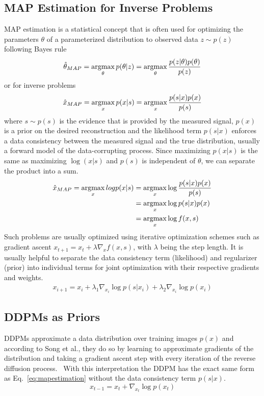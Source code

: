 \subsection{MAP Estimation for Inverse Problems}
MAP estimation is a statistical concept that is often used for optimizing the parameters $\theta$ of a parameterized distribution to observed data $z\sim p(z)$ following Bayes rule
\begin{equation}
    \hat{\theta}_{MAP} = \operatorname*{argmax}_{\theta} p(\theta | z) = \operatorname*{argmax}_{\theta}\frac{p(z|\theta)p(\theta)}{p(z)}
\end{equation}
or for inverse problems
\begin{equation}
    \hat{x}_{MAP} = \operatorname*{argmax}_x p(x|s) = \operatorname*{argmax}_x \frac{p(s|x)p(x)}{p(s)}
\end{equation}
where $s \sim p(s)$ is the evidence that is provided by the measured signal, $p(x)$ is a prior on the desired reconstruction and the likelihood term $p(s|x)$ enforces a data consistency between the measured signal and the true distribution, usually a forward model of the data-corrupting process. Since maximizing $p(x|s)$ is the same as maximizing $\log(x|s)$ and $p(s)$ is independent of $\theta$, we can separate the product into a sum.
\begin{align}
    \hat{x}_{MAP} = \operatorname*{argmax}_x log p(x|s) & = \operatorname*{argmax}_x \log{\frac{p(s|x)p(x)}{p(s)}} \\
                                         & = \operatorname*{argmax}_x \log p(s|x)p(x)               \\
                                         & = \operatorname*{argmax}_x \log f(x, s)
\end{align}
Such problems are usually optimized using iterative optimization schemes such as gradient ascent $x_{t+1} = x_{t} + \lambda \nabla_{x} f(x, s)$, with $\lambda$ being the step length. It is usually helpful to separate the data consistency term (likelihood) and regularizer (prior) into individual terms for joint optimization with their respective gradients and weights.
\begin{align}
    \label{eq:mapestimation}
    x_{i+1} = x_{i} + \lambda_1 \nabla_{x_i} \log p(s|x_i) + \lambda_2 \nabla_{x_i} \log p(x_i)
\end{align}

\subsection{DDPMs as Priors}
DDPMs approximate a data distribution over training images $p(x)$ and according to Song et al., they do so by learning to approximate gradients of the distribution and taking a gradient ascent step with every iteration of the reverse diffusion process.~\autocite{song2020generative} With this interpretation the DDPM has the exact same form as Eq.~\ref{eq:mapestimation} without the data consistency term $p(s|x)$.
\begin{equation}
    \label{eq:ddpmiteration}
    x_{t-1} = x_{t} + \nabla_{x_t} \log p(x_t)
\end{equation}

